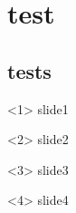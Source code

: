 \documentclass{beamer}
\begin{document}
\section{test}
\subsection{tests}
\begin{frame}
\begin{onlyenv}<1>
slide1
\end{onlyenv}
\begin{onlyenv}<2>
slide2
\end{onlyenv}
\begin{onlyenv}<3>
slide3
\end{onlyenv}
\begin{onlyenv}<4>
slide4
\end{onlyenv}
\end{frame}
\end{document}
